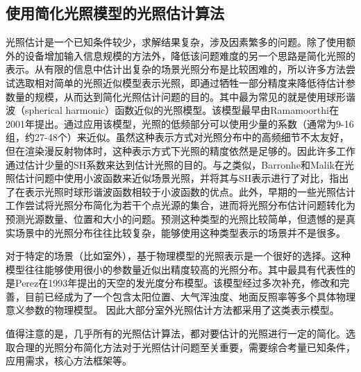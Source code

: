 \subsection{使用简化光照模型的光照估计算法}
光照估计是一个已知条件较少，求解结果复杂，涉及因素繁多的问题。除了使用额外的设备增加输入信息规模的方法外，降低该问题难度的另一个思路是简化光照的表示。从有限的信息中估计出复杂的场景光照分布是比较困难的，所以许多方法尝试选取相对简单的光照近似模型表示光照，即通过牺牲一部分精度来降低待估计参数量的规模，从而达到简化光照估计问题的目的。其中最为常见的就是使用球形谐波（spherical harmonic）函数近似的光照模型。该模型最早由Ramamoorthi\cite{ramamoorthi2001efficient}在2001年提出。通过应用该模型，光照的低频部分可以使用少量的系数（通常为9-16组，约27-48个）来近似。虽然这种表示方式对光照分布中的高频细节不太友好，但在渲染漫反射物体时，这种表示方式下光照的精度依然是足够的。因此许多工作\cite{ramamoorthi2001signal,kemelmacher20113d,garrido2013reconstructing,knorr2014real,li2014intrinsic,barron2015shape}通过估计少量的SH系数来达到估计光照的目的。与之类似，Barronhe和Malik\cite{okabe2004spherical}在光照估计问题中使用小波函数来近似场景光照，并将其与SH表示进行了对比，指出了在表示光照时球形谐波函数相较于小波函数的优点。此外，早期的一些光照估计工作\cite{sato1999acquiring,  panagopoulos2011illumination, wang2002estimation, li2003multiple, sato2003illumination}尝试将光照分布简化为若干个点光源的集合，进而将光照分布估计问题转化为预测光源数量、位置和大小的问题。预测这种类型的光照比较简单，但遗憾的是真实场景中的光照分布往往比较复杂，能够使用这种类型表示的场景并不是很多。

对于特定的场景（比如室外），基于物理模型的光照表示是一个很好的选择。这种模型往往能够使用很小的参数量近似出精度较高的光照分布。其中最具有代表性的是Perez\cite{perez1993all}在1993年提出的天空的发光度分布模型。该模型经过多次补充，修改和完善\cite{nishita1996display, sirai1993display,preetham1999practical,raab2008unbiased,hosek2012analytic, hovsekhovsek2013adding}，目前已经成为了一个包含太阳位置、大气浑浊度、地面反照率等多个具体物理意义参数的物理模型。
因此大部分室外光照估计方法\cite{lalonde2008does, lalonde2010sun, lalonde2012estimating, sunkavalli2008color}都采用了这类表示模型。

值得注意的是，几乎所有的光照估计算法，都对要估计的光照进行一定的简化。选取合理的光照分布简化方法对于光照估计问题至关重要，需要综合考量已知条件，应用需求，核心方法框架等。


